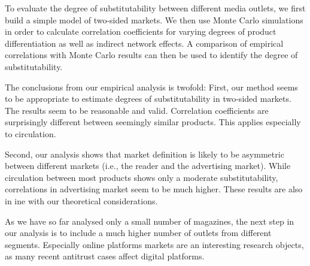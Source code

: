 \documentclass[12pt,a4paper,notitlepage]{article}
\begin{document}
To evaluate the degree of substitutability between different media outlets, we first build a simple model of two-sided markets. We then use Monte Carlo simulations in order to calculate correlation coefficients for varying degrees of product differentiation as well as indirect network effects. A comparison of empirical correlations with Monte Carlo results can then be used to identify the degree of substitutability. 

The conclusions from our empirical analysis is twofold: First, our method seems to be appropriate to estimate degrees of substitutability in two-sided markets. The results seem to be reasonable and valid. Correlation coefficients are surprisingly different between seemingly similar products. This applies especially to circulation. 

Second, our analysis shows that market definition is likely to be asymmetric between different markets (i.e., the reader and the advertising market). While circulation between most products shows only a moderate substitutability, correlations in advertising market seem to be much higher. These results are also in ine with our theoretical considerations. 

As we have so far analysed only a small number of magazines, the next step in our analysis is to include a much higher number of outlets from different segments. Especially online platforms markets are an interesting research objects, as many recent antitrust cases affect digital platforms. \pagebreak


\printbibliography \pagebreak
\end{document}
